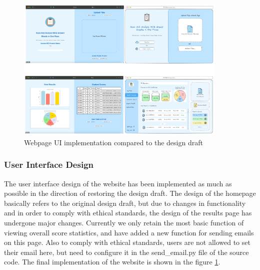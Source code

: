 \documentclass[twocolumn]{article}
\begin{document}
        \begin{figure}
            \centering
            \includegraphics[width=0.9\textwidth]{ui_implementation.png}
            \caption{Webpage UI implementation compared to the design draft}
            \label{ui_implementation}
        \end{figure}
        \subsubsection{User Interface Design}
        The user interface design of the website has been implemented as much as possible in the direction of restoring the design draft. The design of the homepage basically refers to the original design draft, but due to changes in functionality and in order to comply with ethical standards, the design of the results page has undergone major changes. Currently we only retain the most basic function of viewing overall score statistics, and have added a new function for sending emails on this page. Also to comply with ethical standards, users are not allowed to set their email here, but need to configure it in the send\_email.py file of the source code. The final implementation of the website is shown in the figure \ref{ui_implementation}.
\end{document}
